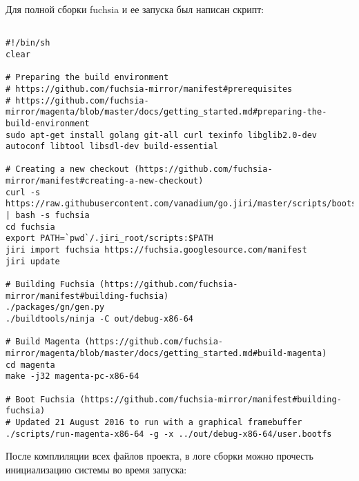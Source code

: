 \documentclass[14pt,a4paper]{article}
\begin{document}
Для полной сборки fuchsia и ее запуска был написан скрипт: 
\begin{lstlisting}

#!/bin/sh
clear

# Preparing the build environment
# https://github.com/fuchsia-mirror/manifest#prerequisites
# https://github.com/fuchsia-mirror/magenta/blob/master/docs/getting_started.md#preparing-the-build-environment
sudo apt-get install golang git-all curl texinfo libglib2.0-dev autoconf libtool libsdl-dev build-essential

# Creating a new checkout (https://github.com/fuchsia-mirror/manifest#creating-a-new-checkout)
curl -s https://raw.githubusercontent.com/vanadium/go.jiri/master/scripts/bootstrap_jiri | bash -s fuchsia
cd fuchsia
export PATH=`pwd`/.jiri_root/scripts:$PATH
jiri import fuchsia https://fuchsia.googlesource.com/manifest
jiri update

# Building Fuchsia (https://github.com/fuchsia-mirror/manifest#building-fuchsia)
./packages/gn/gen.py
./buildtools/ninja -C out/debug-x86-64

# Build Magenta (https://github.com/fuchsia-mirror/magenta/blob/master/docs/getting_started.md#build-magenta)
cd magenta
make -j32 magenta-pc-x86-64

# Boot Fuchsia (https://github.com/fuchsia-mirror/manifest#building-fuchsia)
# Updated 21 August 2016 to run with a graphical framebuffer
./scripts/run-magenta-x86-64 -g -x ../out/debug-x86-64/user.bootfs
\end{lstlisting}

После комплиляции всех файлов проекта, в логе сборки можно прочесть инициализацию системы во время запуска:
\end{document}
